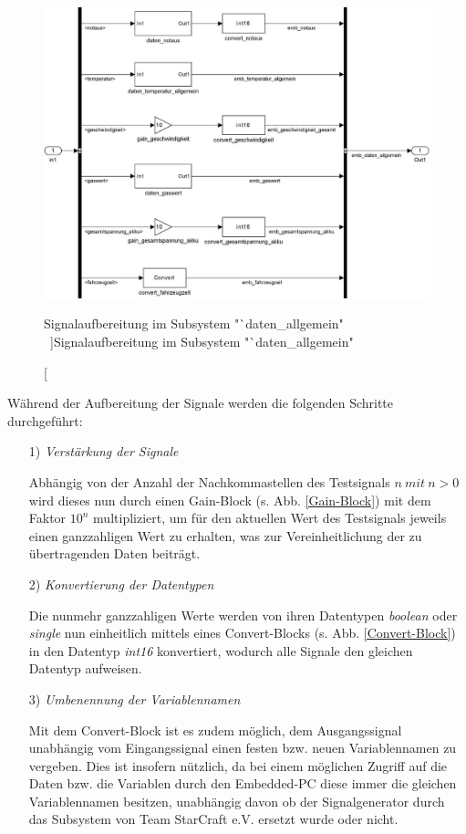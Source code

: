 \documentclass[fontsize = 12pt, paper = a4]{scrreprt}
\begin{document}
\begin{figure}[h]
\centering
\includegraphics[scale = 0.70]{collallgemein}
\caption[Signalaufbereitung im Subsystem "`daten\_allgemein" \ ]{Signalaufbereitung im Subsystem "`daten\_allgemein" \ }
\label{Signalaufbereitung_allg}
\end{figure} 

\newpage


Während der Aufbereitung der Signale werden die folgenden Schritte durchgeführt:

\begin{itemize}

\item[1)] \textit{Verstärkung der Signale}

Abhängig von der Anzahl der Nachkommastellen des Testsignals $n\ mit\ n>0$ wird dieses nun durch einen Gain-Block (s. Abb. \ref{Gain-Block}) mit dem Faktor $10^n$ multipliziert, um für den aktuellen Wert des Testsignals jeweils einen ganzzahligen Wert zu erhalten, was zur Vereinheitlichung der zu übertragenden Daten beiträgt.

\item[2)] \textit{Konvertierung der Datentypen}

Die nunmehr ganzzahligen Werte werden von ihren Datentypen \textit{boolean} oder \textit{single} nun einheitlich mittels eines Convert-Blocks (s. Abb. \ref{Convert-Block}) in den Datentyp \textit{int16} konvertiert, wodurch alle Signale den gleichen Datentyp aufweisen.  

\item[3)] \textit{Umbenennung der Variablennamen}

Mit dem Convert-Block ist es zudem möglich, dem Ausgangssignal unabhängig vom Eingangssignal einen festen bzw. neuen Variablennamen zu vergeben. Dies ist insofern nützlich, da bei einem möglichen Zugriff auf die Daten bzw. die Variablen durch den Embedded-PC diese immer die gleichen Variablennamen besitzen, unabhängig davon ob der Signalgenerator durch das Subsystem von Team StarCraft e.V. ersetzt wurde oder nicht.

\end{itemize}  
\end{document}
